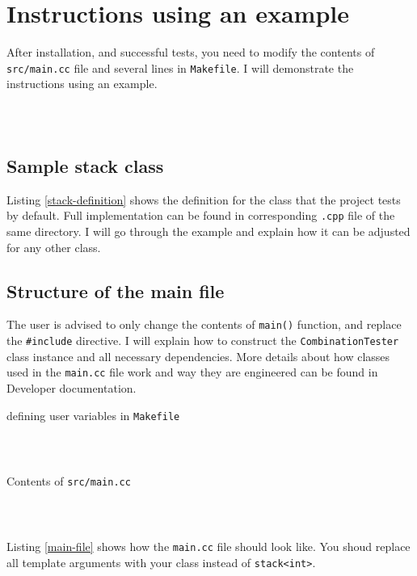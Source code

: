 \documentclass{elteikthesis}[2018/06/06]
\newcommand*{\code}{\lstinline[keywordstyle=\color{violet}, basicstyle=\color{violet}]}
\begin{document}
\section{Instructions using an example}
\label{sec-2-4}
After installation, and successful tests, you need to modify the contents of \code{src/main.cc} file and several lines in \code{Makefile}. I will demonstrate the instructions using an example. \\
\begin{listing}
\caption{\label{stack-definition}definition for the stack class in \code{examples/stack.h}}
\inputminted[firstline=6,lastline=24]{c++}{examples/stack.h} \\
\end{listing}
\subsection{Sample stack  class}
\label{sec-2-4-1}
Listing \ref{stack-definition} shows the definition for the class that the project tests by default. Full implementation can be found in corresponding \code{.cpp} file of the same directory. I will go through the example and explain how it can be adjusted for any other class. \\
\subsection{Structure of the main file}
\label{sec-2-4-2}
The user is advised to only change the contents of \lstinline{main()} function, and replace the \lstinline{#include} directive. I will explain how to construct the \code{CombinationTester} class instance and all necessary dependencies. More details about how classes used in the \code{main.cc} file work and way they are engineered can be found in Developer documentation. \\
\begin{listing}
\caption{\label{makefile-user-variables}defining user variables in \code{Makefile}}
\inputminted[firstline=14,lastline=15]{bash}{Makefile} \\
\end{listing}

\begin{listing}
\caption{\label{main-file}Contents of \code{src/main.cc}}
\inputminted[firstline=28,lastline=52,breaklines]{c++}{src/main.cc} \\
\end{listing}

Listing \ref{main-file} shows how the \code{main.cc} file should look like. You shoud replace all template arguments with your class instead of \code{stack<int>}. \\
\end{document}
